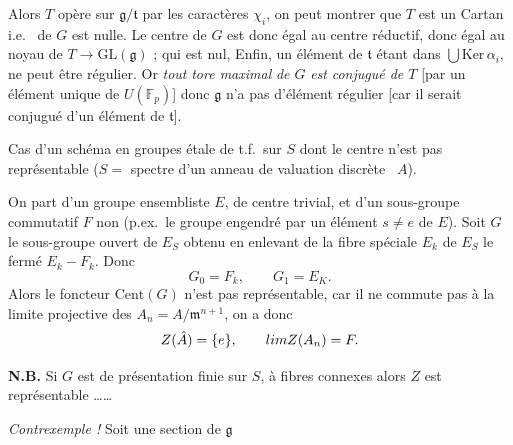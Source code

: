 \documentclass[11pt,a4paper]{article}
\begin{document}
Alors $T$ opère sur $\mathfrak{g}/\mathfrak{t}$ par les
caractères $\chi_i$, on peut montrer que $T$ est un Cartan i.e.\ \ill{}
\ill{}  de $G$ est nulle.
Le centre de $G$ est donc égal au centre réductif,
donc égal au noyau de $T \to \mathrm{GL}(\mathfrak{g})$ ; qui
est nul, \struck{\ill{} \ill{}} Enfin, un \struck{\ill{}}
élément de $\mathfrak{t}$ \struck{\ill{} \ill{}} étant dans
$\bigcup \mathrm{Ker}\, \alpha_i$, ne peut être régulier. Or \emph{tout}
\emph{tore maximal} \emph{de $G$} \emph{est} \emph{conjugué de $T$}
[par un élément unique de $U(\mathbb{F}_p)$] donc
\struck{\ill{}}  $\mathfrak{g}$ n'a pas d'élément
régulier [car il serait conjugué d'un élément de
$\mathfrak{t}$].




Cas d'un schéma en groupes  étale de
t.f.\ sur $S$ dont le centre n'est pas représentable
($S =$ spectre d'un anneau de valuation discrète ~$A$).

On part d'un groupe ensembliste $E$, de centre trivial, et d'un
sous-groupe commutatif \struck{\ill{}} $F$ non
\struck{\ill{}}  (p.ex.\ le groupe engendré par un élément
$s \neq e$ de $E$). Soit  $G$ le sous-groupe ouvert de
$E_S$ obtenu en enlevant de la fibre spéciale $E_k$ de $E_S$ le fermé
$E_k - F_k$. Donc
\[
  G_0 = F_k, \qquad G_1 = E_K .
\]
Alors le foncteur $\mathrm{Cent}(G)$ n'est pas représentable, car il ne
commute pas à la limite projective  des $A_n = A/\mathfrak{m}^{n+1}$, on a donc
\[
  Z(\hat{A}) = \{e\}, \qquad \varprojlim Z(A_n) = F .
\]

\textbf{N.B.} Si $G$ est  de
présentation finie sur $S$, à fibres connexes alors $Z$ est
représentable ……



\emph{Contrexemple !} Soit  une section de
$\mathfrak{g}$
\end{document}

